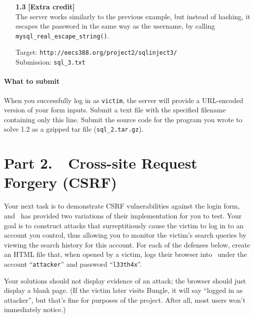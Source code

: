 \documentclass[letterpaper,12pt]{article}
\begin{document}
{\begin{enumerate}
Target: \texttt{{http://eecs388.org/project2/sqlinject2/}}\\
Submissions: {\texttt{sql\_2.txt}} and {\texttt{sql\_2.tar.gz}}

\item[\bf 1.3] \textbf{[Extra credit]}\\
The server works similarly to the previous example, but instead of hashing, it escapes the password in the same way as the username, by calling \texttt{mysql\_real\_escape\_string()}.
\smallskip

Target: \texttt{{http://eecs388.org/project2/sqlinject3/}}\\
Submission: {\texttt{sql\_3.txt}}
\fi

\end{enumerate}

\paragraph{What to submit} When you successfully log in as \texttt{victim}, the server will provide a URL-encoded version of your form inputs.  Submit a text file with the specified filename containing only this line.  Submit the source code for the program you wrote to solve 1.2 as a gzipped tar file (\texttt{sql\_2.tar.gz}).

\newpage

\section*{Part 2.\ \ Cross-site Request Forgery (CSRF)}

Your next task is to demonstrate CSRF vulnerabilities against the login form, and \bungle\ has provided two variations of their implementation for you to test.  Your goal is to construct attacks that surreptitiously cause the victim to log in to an account you control, thus allowing you to monitor the victim's search queries by viewing the search history for this account.  For each of the defenses below, create an HTML file that, when opened by a victim, logs their browser into \bungle\ under the account ``\texttt{attacker}'' and password ``\texttt{l33th4x}''.

\medskip

Your solutions should not display evidence of an attack; the browser should just display a blank page.  (If the victim later visits Bungle, it will say ``logged in as attacker'', but that's fine for purposes of the project.  After all, most users won't immediately notice.)

}
\end{document}
